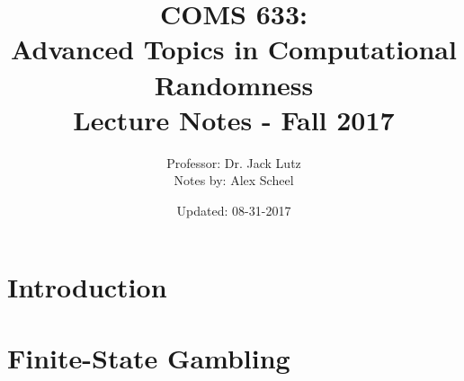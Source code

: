 \documentclass{article}
\title{COMS 633: \\ Advanced Topics in Computational Randomness \\
    \large Lecture Notes - Fall 2017}
\author{Professor: Dr. Jack Lutz \\ Notes by: Alex Scheel}
\date{ Updated: 08-31-2017 }
\numberwithin{equation}{section}
\theoremstyle{plain}
\theoremstyle{definition}
\begin{document}
\maketitle

\section{Introduction}



\section{Finite-State Gambling}


\end{document}
